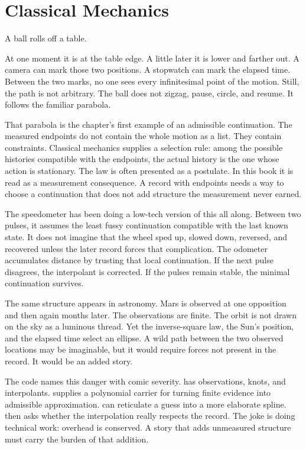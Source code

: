 \chapter{Classical Mechanics}
\label{chap:classical-mechanics}


\begin{chapteressay}

A ball rolls off a table.

At one moment it is at the table edge. A little later it is lower and farther
out. A camera can mark those two positions. A stopwatch can mark the elapsed
time. Between the two marks, no one sees every infinitesimal point of the
motion. Still, the path is not arbitrary. The ball does not zigzag, pause,
circle, and resume. It follows the familiar parabola.

That parabola is the chapter's first example of an admissible continuation. The
measured endpoints do not contain the whole motion as a list. They contain
constraints. Classical mechanics supplies a selection rule: among the possible
histories compatible with the endpoints, the actual history is the one whose
action is stationary. The law is often presented as a postulate. In this book
it is read as a measurement consequence. A record with endpoints needs a way to
choose a continuation that does not add structure the measurement never earned.

The speedometer has been doing a low-tech version of this all along. Between
two pulses, it assumes the least fussy continuation compatible with the last
known state. It does not imagine that the wheel sped up, slowed down, reversed,
and recovered unless the later record forces that complication. The odometer
accumulates distance by trusting that local continuation. If the next pulse
disagrees, the interpolant is corrected. If the pulses remain stable, the
minimal continuation survives.

The same structure appears in astronomy. Mars is observed at one opposition and
then again months later. The observations are finite. The orbit is not drawn
on the sky as a luminous thread. Yet the inverse-square law, the Sun's position,
and the elapsed time select an ellipse. A wild path between the two observed
locations may be imaginable, but it would require forces not present in the
record. It would be an added story.

The code names this danger with comic severity.  has observations,
knots, and interpolants.  supplies a polynomial carrier
for turning finite evidence into admissible approximation. 
can reticulate a guess into a more elaborate spline.  then asks
whether the interpolation really respects the record. The joke is doing
technical work: overhead is conserved. A story that adds unmeasured structure
must carry the burden of that addition.


\end{chapteressay}
